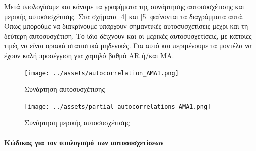 \documentclass[11pt,]{article}
\newenvironment{Shaded}{}{}
\newcommand{\CommentTok}[1]{\textcolor[rgb]{0.38,0.63,0.69}{\textit{#1}}}
\newcommand{\FloatTok}[1]{\textcolor[rgb]{0.25,0.63,0.44}{#1}}
\newcommand{\NormalTok}[1]{#1}
\newcommand{\StringTok}[1]{\textcolor[rgb]{0.25,0.44,0.63}{#1}}
\let\oldparagraph\paragraph
\renewcommand{\paragraph}[1]{\oldparagraph{#1}\mbox{}}
\begin{document}
\begin{Shaded}
\end{Shaded}

Μετά υπολογίσαμε και κάναμε τα γραφήματα της συνάρτησης αυτοσυσχέτισης
και μερικής αυτοσυσχέτισης. Στα σχήματα {[}4{]} και {[}5{]} φαίνονται τα
διαγράμματα αυτά. Όπως μπορούμε να διακρίνουμε υπάρχουν σημαντικές
αυτοσυσχετίσεις μέχρι και τη δεύτερη αυτοσυσχέτιση. Το ίδιο δέιχνουν και
οι μερικές αυτοσυσχετίσεις, με κάποιες τιμές να είναι οριακά στατιστικά
μηδενικές. Για αυτό και περιμένουμε τα μοντέλα να έχουν καλή προσέγγιση
για χαμηλό βαθμό AR ή/και MA.

\begin{figure}
\centering
\texttt{[image: ../assets/autocorrelation\_AMA1.png]}
\caption{Συνάρτηση αυτοσυσχέτισης}
\end{figure}

\begin{figure}
\centering
\texttt{[image: ../assets/partial\_autocorrelations\_AMA1.png]}
\caption{Συνάρτηση μερικής αυτοσυσχέτισης}
\end{figure}

\hypertarget{ux3baux3ceux3b4ux3b9ux3baux3b1ux3c2-ux3b3ux3b9ux3b1-ux3c4ux3bfux3bd-ux3c5ux3c0ux3bfux3bbux3bfux3b3ux3b9ux3c3ux3bcux3cc-ux3c4ux3c9ux3bd-ux3b1ux3c5ux3c4ux3bfux3c3ux3c5ux3c3ux3c7ux3b5ux3c4ux3afux3c3ux3b5ux3c9ux3bd}{%
\paragraph{Κώδικας για τον υπολογισμό των
αυτοσυσχετίσεων}\label{ux3baux3ceux3b4ux3b9ux3baux3b1ux3c2-ux3b3ux3b9ux3b1-ux3c4ux3bfux3bd-ux3c5ux3c0ux3bfux3bbux3bfux3b3ux3b9ux3c3ux3bcux3cc-ux3c4ux3c9ux3bd-ux3b1ux3c5ux3c4ux3bfux3c3ux3c5ux3c3ux3c7ux3b5ux3c4ux3afux3c3ux3b5ux3c9ux3bd}}
\end{document}
